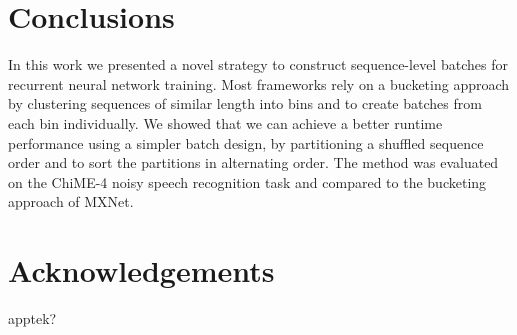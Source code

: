 \documentclass{article}
\begin{document}
      
  \section{Conclusions}
    In this work we presented a novel strategy to construct sequence-level batches for recurrent 
    neural network training. Most frameworks rely on a bucketing approach by clustering sequences of similar length into bins and to create batches from each bin individually. We showed that we can achieve a better runtime performance using a simpler batch design, by partitioning a shuffled sequence order and to sort the partitions in alternating order. The method was evaluated on the ChiME-4 noisy speech recognition task and 
    compared to the bucketing approach of MXNet.

   \section{Acknowledgements}
 
   apptek?
   
   \ninept
   
   
\end{document}

